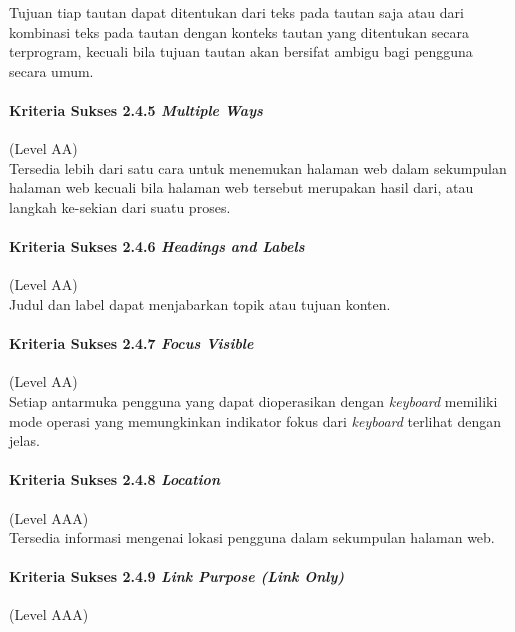 Tujuan tiap tautan dapat ditentukan dari teks pada tautan saja atau dari kombinasi teks pada tautan dengan konteks tautan yang ditentukan secara terprogram, kecuali bila tujuan tautan akan bersifat ambigu bagi pengguna secara umum.

\paragraph{Kriteria Sukses 2.4.5 \textit{Multiple Ways}}
\label{sec:kriteria_sukses_2.4.5}
(Level AA)\\

Tersedia lebih dari satu cara untuk menemukan halaman web dalam sekumpulan halaman web kecuali bila halaman web tersebut merupakan hasil dari, atau langkah ke-sekian dari suatu proses.

\paragraph{Kriteria Sukses 2.4.6 \textit{Headings and Labels}}
\label{sec:kriteria_sukses_2.4.6}
(Level AA)\\
Judul dan label dapat menjabarkan topik atau tujuan konten.

\paragraph{Kriteria Sukses 2.4.7 \textit{Focus Visible}}
\label{sec:kriteria_sukses_2.4.7}
(Level AA)\\

Setiap antarmuka pengguna yang dapat dioperasikan dengan \textit{keyboard} memiliki mode operasi yang memungkinkan indikator fokus dari \textit{keyboard} terlihat dengan jelas.

\paragraph{Kriteria Sukses 2.4.8 \textit{Location}}
\label{sec:kriteria_sukses_2.4.8}
(Level AAA)\\

Tersedia informasi mengenai lokasi pengguna dalam sekumpulan halaman web.

\paragraph{Kriteria Sukses 2.4.9 \textit{Link Purpose (Link Only)}}
\label{sec:kriteria_sukses_2.4.9}
(Level AAA)\\

